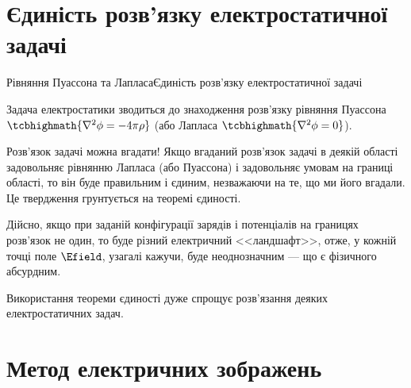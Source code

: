 \documentclass{beamer}
\begin{document}
\section{Єдиність розв'язку електростатичної задачі}



\begin{frame}{Рівняння Пуассона та Лапласа}{Єдиність розв'язку електростатичної задачі}\small
	\begin{block}{}\justifying
		Задача електростатики зводиться до \alert{знаходження розв'язку}
		рівняння Пуассона $\tcbhighmath{\nabla^2\phi = - 4\pi\rho}$ (або Лапласа
		$\tcbhighmath{\nabla^2\phi = 0}$).
	\end{block}
	\begin{block}{}\justifying
		Розв'язок задачі можна \alert{вгадати}! Якщо \alert{вгаданий розв'язок} задачі в деякій
		\alert{області} задовольняє рівнянню Лапласа (або Пуассона)  і задовольняє \alert{умовам на
			границі області}, то він буде правильним і \alert{єдиним}, незважаючи на те, що ми його
		вгадали. Це твердження грунтується на \alert{теоремі єдиності}.
	\end{block}


	\begin{block}{}\justifying\footnotesize
		Дійсно, якщо при заданій конфігурації зарядів і потенціалів
		на границях розв'язок не один, то буде різний електричний <<ландшафт>>, отже, у кожній
		точці поле $\Efield$, узагалі кажучи, буде неоднозначним --- що є фізичного абсурдним.
	\end{block}

	\begin{block}{}\justifying
		Використання теореми єдиності дуже \alert{спрощує} розв'язання деяких електростатичних
		задач.
	\end{block}

\end{frame}



\section{Метод електричних зображень}
\end{document}
